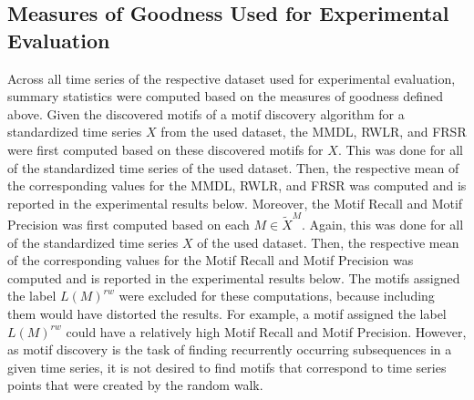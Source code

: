 \subsection*{Measures of Goodness Used for Experimental Evaluation}
Across all time series of the respective dataset used for experimental evaluation, summary statistics were computed based on the measures of goodness defined above. \newline
Given the discovered motifs of a motif discovery algorithm for a standardized time series $X$ from the used dataset, the \ac{MMDL}, \ac{RWLR}, and \ac{FRSR} were first computed based on these discovered motifs for $X$. This was done for all of the standardized time series of the used dataset. Then, the respective mean of the corresponding values for the \ac{MMDL}, \ac{RWLR}, and \ac{FRSR} was computed and is reported in the experimental results below. \newline
Moreover, the Motif Recall and Motif Precision was first computed based on each $M \in \widetilde{X}^{M}$. Again, this was done for all of the standardized time series $X$ of the used dataset. Then, the respective mean of the corresponding values for the Motif Recall and Motif Precision was computed and is reported in the experimental results below. The motifs assigned the label $L(M)^{rw}$ were excluded for these computations, because including them would have distorted the results. For example, a motif assigned the label $L(M)^{rw}$ could have a relatively high Motif Recall and Motif Precision. However, as motif discovery is the task of finding recurrently occurring subsequences in a given time series, it is not desired to find motifs that correspond to time series points that were created by the random walk.
